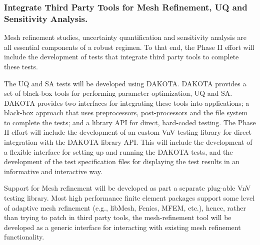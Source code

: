 
\subsubsection{Integrate Third Party Tools for Mesh Refinement, UQ and Sensitivity Analysis.}

Mesh refinement studies, uncertainty quantification and sensitivity analysis are all essential components of a robust \VV regimen. To that
end, the Phase II effort will include the development of \VV tests that integrate third party tools to complete these tests. 

The UQ and SA tests will be developed using DAKOTA. DAKOTA provides a set of black-box tools for performing parameter optimization, UQ 
and SA. DAKOTA provides two interfaces for integrating these tools into applications; a black-box approach that uses preprocessors, post-processors
and the file system to complete the tests; and a library API for direct, hard-coded testing. The Phase II 
effort will include the development of an custom VnV testing library for direct integration with the DAKOTA library API. This will include the development
of a flexible interface for setting up and running the DAKOTA tests, and the development of the test specification files for displaying the test results 
in an informative and interactive way. 

Support for Mesh refinement will be developed as part a separate plug-able VnV testing library. Most high performance finite element packages support
some level of adaptive mesh refinement (e.g., libMesh, Fenics, MFEM, etc.), hence, rather than trying to patch in third party tools, the mesh-refinement tool 
will be developed as a generic interface for interacting with existing mesh refinement functionality. 


